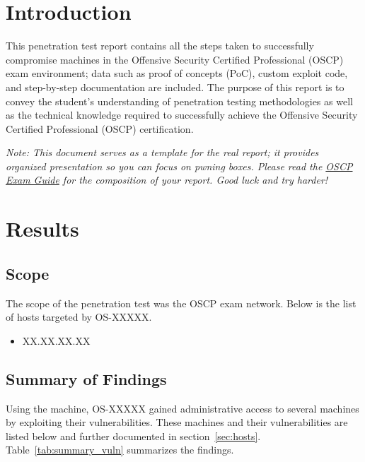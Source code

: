 \documentclass[a4paper, 10pt, oneside]{article}
\newcommand{\osid}{OS-XXXXX}
\begin{document}
\section{Introduction}
This penetration test report contains all the steps taken to successfully compromise machines in the Offensive Security Certified Professional (OSCP) exam environment; data such as proof of concepts (PoC), custom exploit code, and step-by-step documentation are included. The purpose of this report is to convey the student's understanding of penetration testing methodologies as well as the technical knowledge required to successfully achieve the Offensive Security Certified Professional (OSCP) certification.

\textit{Note: This document serves as a template for the real report; it provides organized presentation so you can focus on pwning boxes. Please read the \href{https://support.offensive-security.com/oscp-exam-guide/}{OSCP Exam Guide} for the composition of your report. Good luck and try harder!}

\section{Results}
\subsection{Scope}
The scope of the penetration test was the OSCP exam network. Below is the list of hosts targeted by \osid.
\begin{itemize}
	\item XX.XX.XX.XX
\end{itemize}


\subsection{Summary of Findings}

Using the \client{} machine, \osid{} gained administrative access to several machines by exploiting their vulnerabilities. These machines and their vulnerabilities are listed below and further documented in section~\ref{sec:hosts}. Table~\ref{tab:summary_vuln} summarizes the findings.

\end{document}
